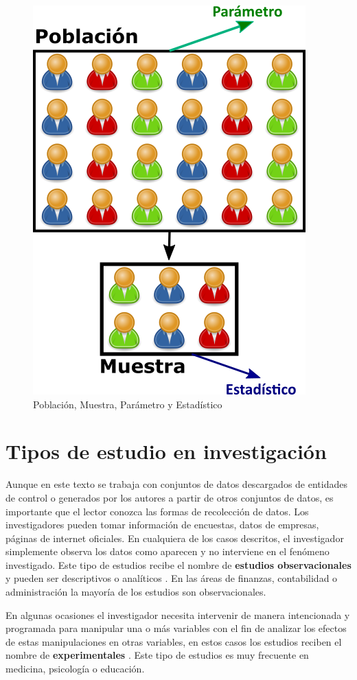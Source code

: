 \documentclass[
]{krantz}
\begin{document}
\begin{figure}[h!]

{\centering \includegraphics[width=0.5\linewidth]{popsample} 

}

\caption{Población, Muestra, Parámetro y Estadístico}\label{fig:popsample}
\end{figure}

\hypertarget{tipos-de-estudio-en-investigacion}{%
\section{Tipos de estudio en investigación}\label{tipos-de-estudio-en-investigacion}}

Aunque en este texto se trabaja con conjuntos de datos descargados de entidades de control o generados por los autores a partir de otros conjuntos de datos, es importante que el lector conozca las formas de recolección de datos. Los investigadores pueden tomar información de encuestas, datos de empresas, páginas de internet oficiales. En cualquiera de los casos descritos, el investigador simplemente observa los datos como aparecen y no interviene en el fenómeno investigado. Este tipo de estudios recibe el nombre de \textbf{estudios observacionales} y pueden ser descriptivos o analíticos \citep{delafuente08}. En las áreas de finanzas, contabilidad o administración la mayoría de los estudios son observacionales.

En algunas ocasiones el investigador necesita intervenir de manera intencionada y programada para manipular una o más variables con el fin de analizar los efectos de estas manipulaciones en otras variables, en estos casos los estudios reciben el nombre de \textbf{experimentales} \citep{miggen07}. Este tipo de estudios es muy frecuente en medicina, psicología o educación.
\end{document}
